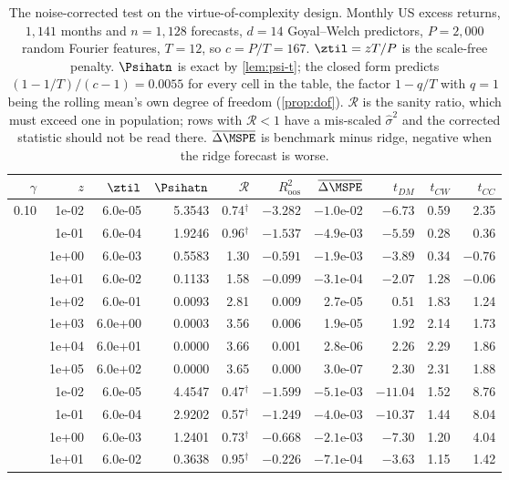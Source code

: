 \begin{table}[htbp]
\centering
\caption{The noise-corrected test on the virtue-of-complexity design. Monthly US excess returns, $1{,}141$ months and $n=1{,}128$ forecasts, $d=14$ Goyal--Welch predictors, $P=2,000$ random Fourier features, $T=12$, so $c=P/T=167$. $\ztil=zT/P$ is the scale-free penalty. $\Psihatn$ is exact by \cref{lem:psi-t}; the closed form predicts $(1-1/T)/(c-1)=0.0055$ for every cell in the table, the factor $1-q/T$ with $q=1$ being the rolling mean's own degree of freedom (\cref{prop:dof}). $\mathcal R$ is the sanity ratio, which must exceed one in population; rows with $\mathcal R<1$ have a mis-scaled $\hat\sigma^2$ and the corrected statistic should not be read there. $\overline{\Delta\MSPE}$ is benchmark minus ridge, negative when the ridge forecast is worse.}
\label{tab:voc-grid}
\small
\begin{tabular}{rrrrrrrrrr}
\toprule
$\gamma$ & $z$ & $\ztil$ & $\Psihatn$ & $\mathcal R$ & $R^2_{\text{oos}}$ & $\overline{\Delta\MSPE}$ & $t_{DM}$ & $t_{CW}$ & $t_{CC}$ \\
\midrule
0.10 & 1e-02 & 6.0e-05 & 5.3543 & 0.74$^{\dagger}$ & $-3.282$ & $-1.0$e-02 & $-6.73$ & 0.59 & 2.35 \\
 & 1e-01 & 6.0e-04 & 1.9246 & 0.96$^{\dagger}$ & $-1.537$ & $-4.9$e-03 & $-5.59$ & 0.28 & 0.36 \\
 & 1e+00 & 6.0e-03 & 0.5583 & 1.30 & $-0.591$ & $-1.9$e-03 & $-3.89$ & 0.34 & $-0.76$ \\
 & 1e+01 & 6.0e-02 & 0.1133 & 1.58 & $-0.099$ & $-3.1$e-04 & $-2.07$ & 1.28 & $-0.06$ \\
 & 1e+02 & 6.0e-01 & 0.0093 & 2.81 & 0.009 & 2.7e-05 & 0.51 & 1.83 & 1.24 \\
 & 1e+03 & 6.0e+00 & 0.0003 & 3.56 & 0.006 & 1.9e-05 & 1.92 & 2.14 & 1.73 \\
 & 1e+04 & 6.0e+01 & 0.0000 & 3.66 & 0.001 & 2.8e-06 & 2.26 & 2.29 & 1.86 \\
 & 1e+05 & 6.0e+02 & 0.0000 & 3.65 & 0.000 & 3.0e-07 & 2.30 & 2.31 & 1.88 \\
\addlinespace
0.30 & 1e-02 & 6.0e-05 & 4.4547 & 0.47$^{\dagger}$ & $-1.599$ & $-5.1$e-03 & $-11.04$ & 1.52 & 8.76 \\
 & 1e-01 & 6.0e-04 & 2.9202 & 0.57$^{\dagger}$ & $-1.249$ & $-4.0$e-03 & $-10.37$ & 1.44 & 8.04 \\
 & 1e+00 & 6.0e-03 & 1.2401 & 0.73$^{\dagger}$ & $-0.668$ & $-2.1$e-03 & $-7.30$ & 1.20 & 4.04 \\
 & 1e+01 & 6.0e-02 & 0.3638 & 0.95$^{\dagger}$ & $-0.226$ & $-7.1$e-04 & $-3.63$ & 1.15 & 1.42 \\

\end{tabular}
\end{table}
